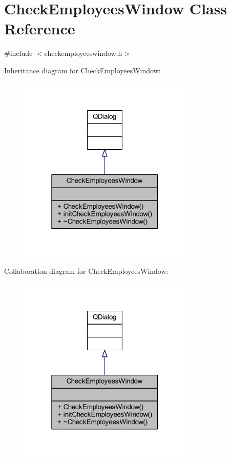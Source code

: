\hypertarget{class_check_employees_window}{}\section{Check\+Employees\+Window Class Reference}
\label{class_check_employees_window}


{\ttfamily \#include $<$checkemployeeswindow.\+h$>$}



Inheritance diagram for Check\+Employees\+Window\+:
\nopagebreak
\begin{figure}[H]
\begin{center}
\leavevmode
\includegraphics[width=235pt]{class_check_employees_window__inherit__graph}
\end{center}
\end{figure}


Collaboration diagram for Check\+Employees\+Window\+:
\nopagebreak
\begin{figure}[H]
\begin{center}
\leavevmode
\includegraphics[width=235pt]{class_check_employees_window__coll__graph}
\end{center}
\end{figure}
